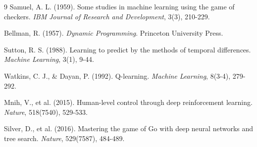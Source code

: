 \begin{thebibliography}{9}
Samuel, A. L. (1959). Some studies in machine learning using the game of checkers. \textit{IBM Journal of Research and Development}, 3(3), 210-229.

Bellman, R. (1957). \textit{Dynamic Programming}. Princeton University Press.

Sutton, R. S. (1988). Learning to predict by the methods of temporal differences. \textit{Machine Learning}, 3(1), 9-44.

Watkins, C. J., \& Dayan, P. (1992). Q-learning. \textit{Machine Learning}, 8(3-4), 279-292.

Mnih, V., et al. (2015). Human-level control through deep reinforcement learning. \textit{Nature}, 518(7540), 529-533.

Silver, D., et al. (2016). Mastering the game of Go with deep neural networks and tree search. \textit{Nature}, 529(7587), 484-489.
\end{thebibliography}


